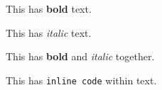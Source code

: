 This has \textbf{bold} text.

This has \textit{italic} text.

This has \textbf{bold} and \textit{italic} together.

This has \texttt{inline code} within text.
